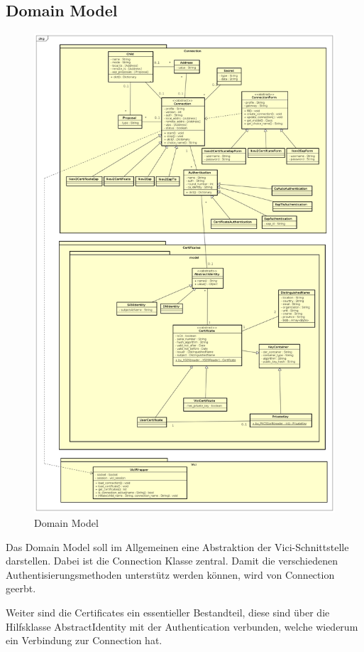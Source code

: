 \subsection{Domain Model}

\begin{figure}[H]
\centering
\includegraphics[width=420pt]{images/domain_model_strongman.png}
\caption[Domain Model]{Domain Model}
\end{figure}

Das Domain Model soll im Allgemeinen eine Abstraktion der Vici-Schnittstelle darstellen.
Dabei ist die Connection Klasse zentral. Damit die verschiedenen Authentisierungsmethoden unterstütz werden können, wird von Connection geerbt.

Weiter sind die Certificates ein essentieller Bestandteil, diese sind über die Hilfsklasse AbstractIdentity mit der Authentication verbunden, welche wiederum ein Verbindung zur Connection hat.

\newpage